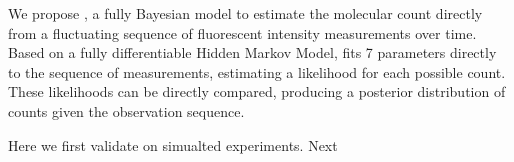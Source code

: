 We propose \ours, a fully Bayesian model to estimate the molecular 
  count directly from a fluctuating sequence of fluorescent intensity measurements over time.
  Based on a fully differentiable Hidden Markov Model, \ours fits 7 parameters
  directly to the sequence of measurements, estimating a likelihood for each possible count. 
  These likelihoods can be directly compared, producing a posterior distribution of counts 
  given the observation sequence. 

Here we first validate \ours on simualted experiments. Next \cite{patel_blinking_2021}

